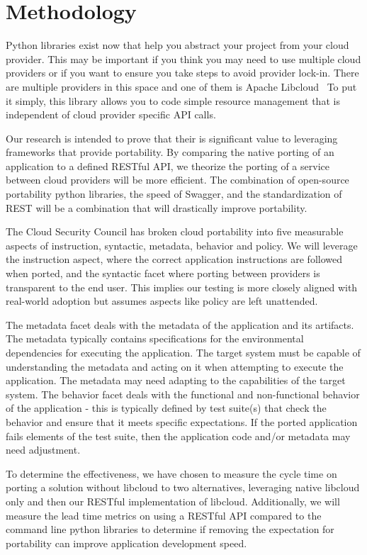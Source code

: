 \section{Methodology}

Python libraries exist now that help you abstract your project from  your cloud provider. 
This may be important if you think you may need to use multiple cloud providers or if you 
want to ensure you take steps to avoid provider lock-in. There are multiple providers in 
this space and one of them is Apache Libcloud~\cite{hid-sp18-518-LibCloud} To put it 
simply, this library allows you to code simple resource  management that is independent 
of cloud provider specific API calls.

Our research is intended to prove that their is significant value to leveraging 
frameworks that provide portability. By comparing the native porting of an application to
a defined RESTful API, we theorize the porting of a service between cloud providers will
be more efficient. The combination of open-source portability python libraries, the speed 
of Swagger, and the standardization of REST will be a combination that will drastically
improve portability.

The Cloud Security Council has broken cloud portability into five measurable aspects of 
instruction, syntactic, metadata, behavior and policy. We will leverage the instruction
aspect, where the correct application instructions are followed when ported, and the 
syntactic facet where porting between providers is transparent to the end user. This
implies our testing is more closely aligned with real-world adoption but assumes aspects
like policy are left unattended.~\cite{hid-sp18-518-Cloud-Council}

The metadata facet deals with the metadata of the application and its artifacts. The metadata typically
contains specifications for the environmental dependencies for executing the application. The target
system must be capable of understanding the metadata and acting on it when attempting to execute
the application. The metadata may need adapting to the capabilities of the target system.
The behavior facet deals with the functional and non-functional behavior of the application - this is
typically defined by test suite(s) that check the behavior and ensure that it meets specific expectations.
If the ported application fails elements of the test suite, then the application code and/or metadata may
need adjustment.

To determine the effectiveness, we have chosen to measure the cycle time on porting a 
solution without libcloud to two alternatives, leveraging native libcloud only and then 
our RESTful implementation of libcloud. Additionally, we will measure the lead time 
metrics on using a RESTful API compared to the command line python libraries to determine
if removing the expectation for portability can improve application development speed.

